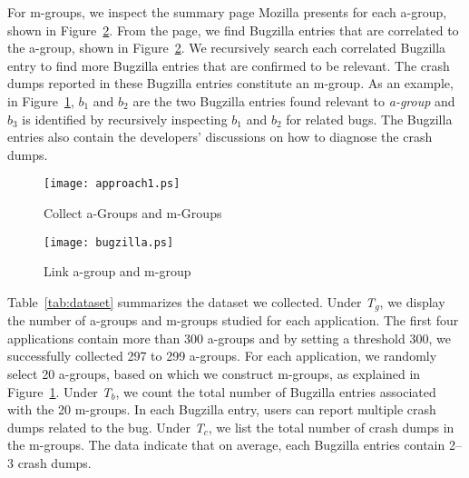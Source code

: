 For m-groups, we inspect the summary page Mozilla presents for each a-group, shown in Figure~\ref{fig:bugzilla}. From the page, we find Bugzilla entries that are correlated to the a-group, shown in Figure~\ref{fig:bugzilla}. We recursively search each correlated Bugzilla entry to find more Bugzilla entries that are confirmed to be relevant. The crash dumps reported in these Bugzilla entries constitute an m-group. As an example, in Figure~\ref{fig:dataprocess}, $b_1$ and $b_2$ are the two Bugzilla entries found relevant to {\it a-group} and $b_3$ is identified by recursively inspecting $b_1$ and $b_2$ for related bugs. The Bugzilla entries also contain the developers' discussions on how to diagnose the crash dumps. 

\begin{figure}[!htb]
\centering
\texttt{[image: approach1.ps]}
\caption{\small Collect a-Groups and m-Groups~\label{fig:dataprocess}}
\normalsize
\end{figure}

\begin{figure}[!htb]
\centering
\texttt{[image: bugzilla.ps]}
\caption{Link a-group and m-group~\label{fig:bugzilla}}
\normalsize
\end{figure}

Table~\ref{tab:dataset} summarizes the dataset we collected. Under {\it T$_g$}, we display the number of a-groups and m-groups studied for each application. The first four applications contain more than 300 a-groups and by setting a threshold 300, we successfully collected 297 to 299 a-groups. For each application, we randomly select 20 a-groups, based on which we construct m-groups, as explained in Figure~\ref{fig:dataprocess}. Under {\it T$_b$}, we count the total number of Bugzilla entries associated with the 20 m-groups. In each Bugzilla entry, users can report multiple crash dumps related to the bug. Under {\it T$_c$}, we list the total number of crash dumps in the m-groups. The data indicate that on average, each Bugzilla entries contain 2--3 crash dumps.

